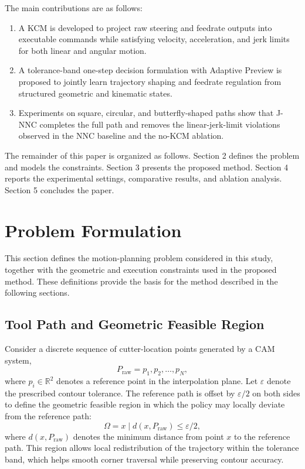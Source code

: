 \documentclass[preprint,12pt]{elsarticle}
\begin{document}
The main contributions are as follows:
\begin{enumerate}
\item[(1)] A KCM is developed to project raw steering and feedrate outputs into executable commands while satisfying velocity, acceleration, and jerk limits for both linear and angular motion.
\item[(2)] A tolerance-band one-step decision formulation with Adaptive Preview is proposed to jointly learn trajectory shaping and feedrate regulation from structured geometric and kinematic states.
\item[(3)] Experiments on square, circular, and butterfly-shaped paths show that J-NNC completes the full path and removes the linear-jerk-limit violations observed in the NNC baseline and the no-KCM ablation.
\end{enumerate}

The remainder of this paper is organized as follows. Section 2 defines the problem and models the constraints. Section 3 presents the proposed method. Section 4 reports the experimental settings, comparative results, and ablation analysis. Section 5 concludes the paper.

\section{Problem Formulation}
\label{sec:problem_formulation}
This section defines the motion-planning problem considered in this study, together with the geometric and execution constraints used in the proposed method. These definitions provide the basis for the method described in the following sections.

\subsection{Tool Path and Geometric Feasible Region}
Consider a discrete sequence of cutter-location points generated by a CAM system,
\begin{equation}
P_{\mathrm{raw}}={p_1,p_2,\dots,p_N},
\end{equation}
where $p_i\in\mathbb{R}^2$ denotes a reference point in the interpolation plane. Let $\varepsilon$ denote the prescribed contour tolerance. The reference path is offset by $\varepsilon/2$ on both sides to define the geometric feasible region in which the policy may locally deviate from the reference path:
\begin{equation}
\Omega={x\mid d(x,P_{\mathrm{raw}})\leq \varepsilon/2},
\label{eq:feasible_region}
\end{equation}
where $d(x,P_{\mathrm{raw}})$ denotes the minimum distance from point $x$ to the reference path. This region allows local redistribution of the trajectory within the tolerance band, which helps smooth corner traversal while preserving contour accuracy.
\end{document}

